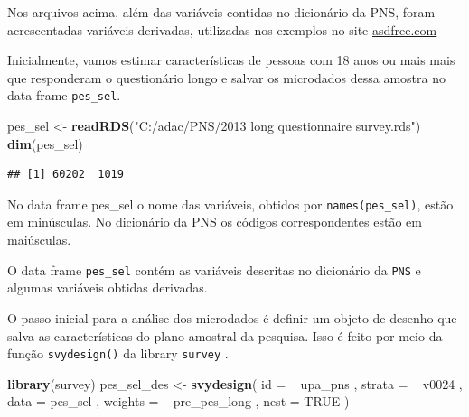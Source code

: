 \documentclass[]{book}
\newenvironment{Shaded}{\begin{snugshade}}{\end{snugshade}}
\newcommand{\KeywordTok}[1]{\textcolor[rgb]{0.13,0.29,0.53}{\textbf{{#1}}}}
\newcommand{\DataTypeTok}[1]{\textcolor[rgb]{0.13,0.29,0.53}{{#1}}}
\newcommand{\StringTok}[1]{\textcolor[rgb]{0.31,0.60,0.02}{{#1}}}
\newcommand{\OtherTok}[1]{\textcolor[rgb]{0.56,0.35,0.01}{{#1}}}
\newcommand{\NormalTok}[1]{{#1}}
\numberwithin{example}{chapter}
\numberwithin{remark}{chapter}
\numberwithin{definition}{chapter}
\let\BeginKnitrBlock\begin \let\EndKnitrBlock\end
\begin{document}
\BeginKnitrBlock{remark}
Nos arquivos acima, além das variáveis
contidas no dicionário da PNS, foram acrescentadas variáveis derivadas,
utilizadas nos exemplos no site
\href{https://github.com/ajdamico/asdfree/tree/master/Pesquisa\%20Nacional\%20De\%20Saude}{asdfree.com}
\EndKnitrBlock{remark}

Inicialmente, vamos estimar características de pessoas com 18 anos ou
mais mais que responderam o questionário longo e salvar os microdados
dessa amostra no data frame \texttt{pes\_sel}.

\begin{Shaded}
\begin{Highlighting}[]
\NormalTok{pes_sel <-}\StringTok{ }\KeywordTok{readRDS}\NormalTok{(}\StringTok{"C:/adac/PNS/2013 long questionnaire survey.rds"}\NormalTok{)}
\KeywordTok{dim}\NormalTok{(pes_sel)}
\end{Highlighting}
\end{Shaded}

\begin{verbatim}
## [1] 60202  1019
\end{verbatim}

\BeginKnitrBlock{remark}
No data frame pes\_sel o nome das variáveis,
obtidos por \texttt{names(pes\_sel)}, estão em minúsculas. No dicionário
da PNS os códigos correspondentes estão em maiúsculas.
\EndKnitrBlock{remark} O data frame \texttt{pes\_sel} contém as
variáveis descritas no dicionário da \texttt{PNS} e algumas variáveis
obtidas derivadas.

O passo inicial para a análise dos microdados é definir um objeto de
desenho que salva as características do plano amostral da pesquisa. Isso
é feito por meio da função \texttt{svydesign()} da library
\texttt{survey} \citep{R-survey}.

\begin{Shaded}
\begin{Highlighting}[]
\KeywordTok{library}\NormalTok{(survey)}
\NormalTok{pes_sel_des <-}
\StringTok{    }\KeywordTok{svydesign}\NormalTok{(}
        \DataTypeTok{id =} \NormalTok{~}\StringTok{ }\NormalTok{upa_pns ,}
        \DataTypeTok{strata =} \NormalTok{~}\StringTok{ }\NormalTok{v0024 ,}
        \DataTypeTok{data =} \NormalTok{pes_sel ,}
        \DataTypeTok{weights =} \NormalTok{~}\StringTok{ }\NormalTok{pre_pes_long ,}
        \DataTypeTok{nest =} \OtherTok{TRUE}
    \NormalTok{)}
\end{Highlighting}
\end{Shaded}
\end{document}
